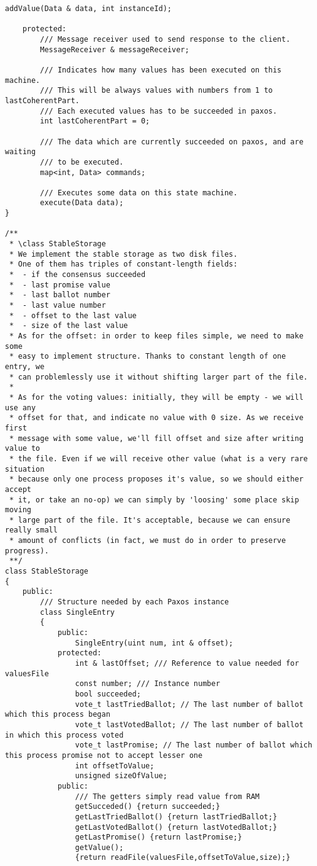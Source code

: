 \begin{lstlisting}[frame=lines,caption=Pseudocode of Paxos algorithm]
		addValue(Data & data, int instanceId);
		
	protected:
		/// Message receiver used to send response to the client.
		MessageReceiver & messageReceiver;
		
		/// Indicates how many values has been executed on this machine.
		/// This will be always values with numbers from 1 to lastCoherentPart.
		/// Each executed values has to be succeeded in paxos.
		int lastCoherentPart = 0;
		
		/// The data which are currently succeeded on paxos, and are waiting 
		/// to be executed.
		map<int, Data> commands;
		
		/// Executes some data on this state machine.
		execute(Data data);
}

/**
 * \class StableStorage
 * We implement the stable storage as two disk files.
 * One of them has triples of constant-length fields:
 *  - if the consensus succeeded
 *  - last promise value
 *  - last ballot number
 *  - last value number
 *  - offset to the last value
 *  - size of the last value
 * As for the offset: in order to keep files simple, we need to make some
 * easy to implement structure. Thanks to constant length of one entry, we
 * can problemlessly use it without shifting larger part of the file.
 *
 * As for the voting values: initially, they will be empty - we will use any
 * offset for that, and indicate no value with 0 size. As we receive first
 * message with some value, we'll fill offset and size after writing value to
 * the file. Even if we will receive other value (what is a very rare situation
 * because only one process proposes it's value, so we should either accept
 * it, or take an no-op) we can simply by 'loosing' some place skip moving
 * large part of the file. It's acceptable, because we can ensure really small
 * amount of conflicts (in fact, we must do in order to preserve progress).
 **/
class StableStorage
{
	public:
		/// Structure needed by each Paxos instance
		class SingleEntry
		{
			public:
				SingleEntry(uint num, int & offset);
			protected:
				int & lastOffset; /// Reference to value needed for valuesFile
				const number; /// Instance number
				bool succeeded;
				vote_t lastTriedBallot; // The last number of ballot which this process began
				vote_t lastVotedBallot; // The last number of ballot in which this process voted
				vote_t lastPromise; // The last number of ballot which this process promise not to accept lesser one
				int offsetToValue;
				unsigned sizeOfValue;
			public:
				/// The getters simply read value from RAM
				getSucceded() {return succeeded;}
				getLastTriedBallot() {return lastTriedBallot;}
				getLastVotedBallot() {return lastVotedBallot;}
				getLastPromise() {return lastPromise;}
				getValue();
				{return readFile(valuesFile,offsetToValue,size);}


\end{lstlisting}
